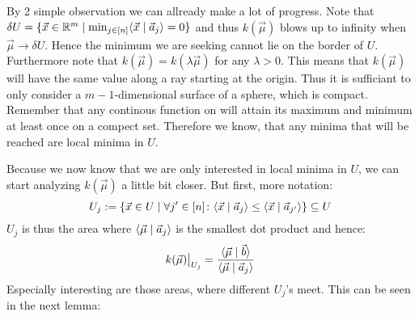 By 2 simple observation we can allready make a lot of progress. Note that $\delta U = \{\vec x \in \mathbb{R}^m \mid \min_{j \in [n]}\langle \vec x \mid \vec a_j \rangle = 0\}$ and thus $k(\vec \mu)$ blows up to infinity when $\vec \mu \to \delta U$. Hence the minimum we are seeking cannot lie on the border of $U$. Furthermore note that $k(\vec \mu) = k(\lambda \vec\mu)$ for any $\lambda > 0$. This means that $k(\vec \mu)$ will have the same value along a ray starting at the origin. Thus it is sufficiant to only consider a $m-1$-dimensional surface of a sphere, which is compact. Remember that any continous function on will attain its maximum and minimum at least once on a compect set. Therefore we know, that any minima that will be reached are local minima in $U$.

Because we now know that we are only interested in local minima in $U$, we can start analyzing $k(\vec \mu)$ a little bit closer. But first, more notation:
$$U_j := \{\vec x \in U \mid \forall j' \in [n]\colon \langle \vec x \mid \vec a_j \rangle \leq \langle \vec x \mid \vec a_{j'} \rangle\} \subseteq U$$
$U_j$ is thus the area where $\langle \vec\mu \mid \vec a_j \rangle$ is the smallest dot product and hence:
$$\restrict{k(\vec\mu)}{U_j} = \frac{\sprod{\vec\mu}{\vec b}}{\sprod{\vec\mu}{\vec a_j}}$$
Especially interesting are those areas, where different $U_j$'s meet. This can be seen in the next lemma:

